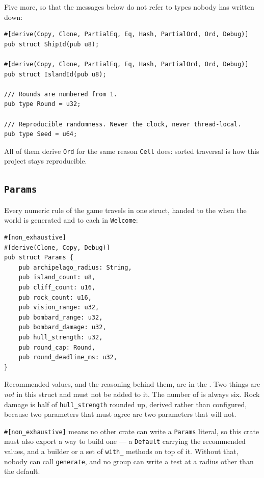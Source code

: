 \documentclass{article}
\begin{document}
Five more, so that the messages below do not refer to types nobody has written down:

\begin{lstlisting}
#[derive(Copy, Clone, PartialEq, Eq, Hash, PartialOrd, Ord, Debug)]
pub struct ShipId(pub u8);

#[derive(Copy, Clone, PartialEq, Eq, Hash, PartialOrd, Ord, Debug)]
pub struct IslandId(pub u8);

/// Rounds are numbered from 1.
pub type Round = u32;

/// Reproducible randomness. Never the clock, never thread-local.
pub type Seed = u64;
\end{lstlisting}

All of them derive \texttt{Ord} for the same reason \texttt{Cell} does: sorted traversal is how
this project stays reproducible.

\subsection{\texttt{Params}}
\label{proto:params}

Every numeric rule of the game travels in one struct, handed to the \chart{} when the world is
generated and to each \ship{} in \texttt{Welcome}:

\begin{lstlisting}
#[non_exhaustive]
#[derive(Clone, Copy, Debug)]
pub struct Params {
    pub archipelago_radius: String,
    pub island_count: u8,
    pub cliff_count: u16,
    pub rock_count: u16,
    pub vision_range: u32,
    pub bombard_range: u32,
    pub bombard_damage: u32,
    pub hull_strength: u32,
    pub round_cap: Round,
    pub round_deadline_ms: u32,
}
\end{lstlisting}

Recommended values, and the reasoning behind them, are in the \MD. Two things are \emph{not} in
this struct and must not be added to it. The number of \ships{} is always six. Rock damage is
half of \texttt{hull\_strength} rounded up, derived rather than configured, because two parameters
that must agree are two parameters that will not.

\texttt{\#[non\_exhaustive]} means no other crate can write a \texttt{Params} literal, so this
crate must also export a way to build one --- a \texttt{Default} carrying the recommended values,
and a builder or a set of \texttt{with\_} methods on top of it. Without that, nobody can call
\texttt{generate}, and no group can write a test at a radius other than the default.
\end{document}
